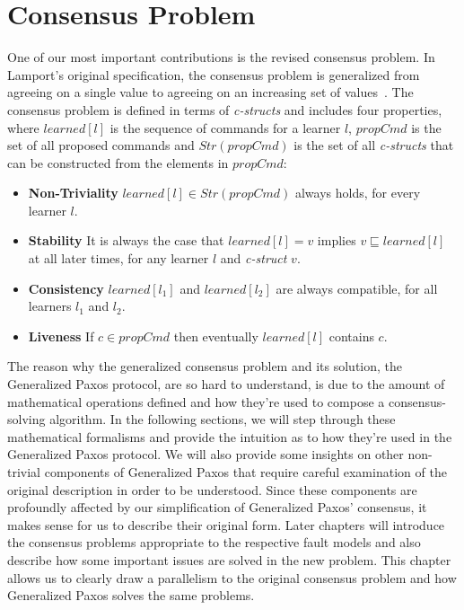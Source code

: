 \chapter{Consensus Problem} \label{problem}

One of our most important contributions is the revised consensus problem. In Lamport's original specification, the consensus problem is generalized from agreeing on a single value to agreeing on an increasing set of values~\cite{Lamport2005}. The consensus problem is defined in terms of \textit{c-structs} and includes four properties, where $learned[l]$ is the sequence of commands for a learner $l$, $propCmd$ is the set of all proposed commands and $Str(propCmd)$ is the set of all \textit{c-structs} that can be constructed from the elements in $propCmd$:
\begin{itemize}
	\item \textbf{Non-Triviality} $learned[l] \in Str(propCmd)$ always holds, for every learner $l$.
	\item \textbf{Stability} It is always the case that $learned[l] = v$ implies $v \sqsubseteq learned[l]$ at all later times, for any learner $l$ and \textit{c-struct} $v$.
	\item \textbf{Consistency} $learned[l_1]$ and $learned[l_2]$ are always compatible, for all learners $l_1$ and $l_2$.
	\item \textbf{Liveness} If $c \in propCmd$ then eventually $learned[l]$ contains $c$.
\end{itemize}

\par
The reason why the generalized consensus problem and its solution, the Generalized Paxos protocol, are so hard to understand, is due to the amount of mathematical operations defined and how they're used to compose a consensus-solving algorithm. In the following sections, we will step through these mathematical formalisms and provide the intuition as to how they're used in the Generalized Paxos protocol. We will also provide some insights on other non-trivial components of Generalized Paxos that require careful examination of the original description in order to be understood. Since these components are profoundly affected by our simplification of Generalized Paxos' consensus, it makes sense for us to describe their original form. Later chapters will introduce the consensus problems appropriate to the respective fault models and also describe how some important issues are solved in the new problem. This chapter allows us to clearly draw a parallelism to the original consensus problem and how Generalized Paxos solves the same problems.

